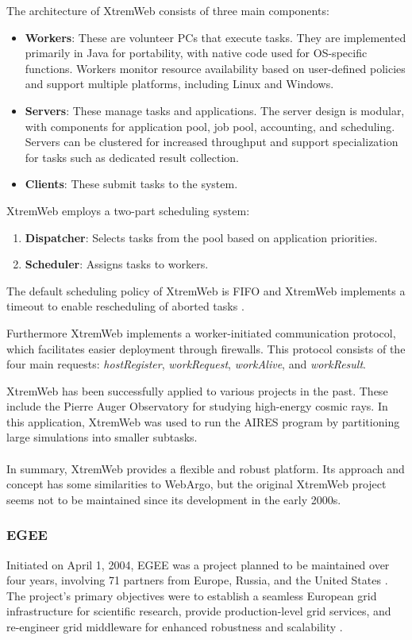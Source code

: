 The architecture of XtremWeb consists of three main components:
\begin{itemize}
  \item \textbf{Workers}: These are volunteer \acs{PC}s that execute tasks. They are implemented primarily in Java for portability, with native code used for \ac{OS}-specific functions. Workers monitor resource availability based on user-defined policies and support multiple platforms, including Linux and Windows.
  \item \textbf{Servers}: These manage tasks and applications. The server design is modular, with components for application pool, job pool, accounting, and scheduling. Servers can be clustered for increased throughput and support specialization for tasks such as dedicated result collection.
  \item \textbf{Clients}: These submit tasks to the system.
\end{itemize}
XtremWeb employs a two-part scheduling system:
\begin{enumerate}
  \item \textbf{Dispatcher}: Selects tasks from the pool based on application priorities.
  \item \textbf{Scheduler}: Assigns tasks to workers.
\end{enumerate}
The default scheduling policy of XtremWeb is \ac{FIFO} and XtremWeb implements a timeout to enable rescheduling of aborted tasks \cite{relatedwork:xtremweb}.

Furthermore XtremWeb implements a worker-initiated communication protocol, which facilitates easier deployment through firewalls. This protocol consists of the four main requests: \emph{hostRegister}, \emph{workRequest}, \emph{workAlive}, and \emph{workResult}. \cite{relatedwork:xtremweb}

XtremWeb has been successfully applied to various projects in the past. These include the Pierre Auger Observatory for studying high-energy cosmic rays. In this application, XtremWeb was used to run the \ac{AIRES} program by partitioning large simulations into smaller subtasks. \cite{relatedwork:xtremweb}
\\~\\
In summary, XtremWeb provides a flexible and robust platform. Its approach and concept has some similarities to WebArgo, but the original XtremWeb project seems not to be maintained since its development in the early 2000s.

\subsubsection{EGEE}
\label{subsec:background:related_work:egee}
Initiated on April 1, 2004, \ac{EGEE} was a project planned to be maintained over four years, involving 71 partners from Europe, Russia, and the United States \cite{relatedwork:egee}. The project's primary objectives were to establish a seamless European grid infrastructure for scientific research, provide production-level grid services, and re-engineer grid middleware for enhanced robustness and scalability \cite{relatedwork:egee}.

